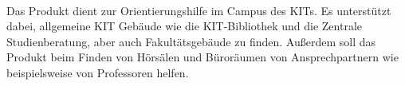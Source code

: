 \paragraph*{}
Das Produkt dient zur Orientierungshilfe im Campus des \Gls{KIT}s.
Es unterstützt dabei, allgemeine KIT Gebäude wie die \Gls{KIT}-Bibliothek und die Zentrale Studienberatung, aber auch Fakultätsgebäude zu finden. 
Außerdem soll das Produkt beim Finden von Hörsälen und Büroräumen von Ansprechpartnern wie beispielsweise von Professoren helfen.